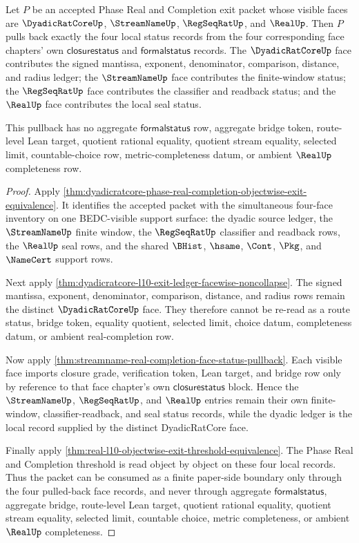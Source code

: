 \begin{theorem}
\label{thm:dyadicratcore-l10-face-status-pullback}
Let $P$ be an accepted Phase Real and Completion exit packet whose visible faces are $\DyadicRatCoreUp$, $\StreamNameUp$, $\RegSeqRatUp$, and $\RealUp$. Then $P$ pulls back exactly the four local status records from the four corresponding face chapters' own $\mathsf{closurestatus}$ and $\mathsf{formalstatus}$ records. The $\DyadicRatCoreUp$ face contributes the signed mantissa, exponent, denominator, comparison, distance, and radius ledger; the $\StreamNameUp$ face contributes the finite-window status; the $\RegSeqRatUp$ face contributes the classifier and readback status; and the $\RealUp$ face contributes the local seal status.

This pullback has no aggregate $\mathsf{formalstatus}$ row, aggregate bridge token, route-level Lean target, quotient rational equality, quotient stream equality, selected limit, countable-choice row, metric-completeness datum, or ambient $\RealUp$ completeness row.
\end{theorem}
\begin{proof}
Apply \autoref{thm:dyadicratcore-phase-real-completion-objectwise-exit-equivalence}. It identifies the accepted packet with the simultaneous four-face inventory on one BEDC-visible support surface: the dyadic source ledger, the $\StreamNameUp$ finite window, the $\RegSeqRatUp$ classifier and readback rows, the $\RealUp$ seal rows, and the shared $\BHist$, $\hsame$, $\Cont$, $\Pkg$, and $\NameCert$ support rows.

Next apply \autoref{thm:dyadicratcore-l10-exit-ledger-facewise-noncollapse}. The signed mantissa, exponent, denominator, comparison, distance, and radius rows remain the distinct $\DyadicRatCoreUp$ face. They therefore cannot be re-read as a route status, bridge token, equality quotient, selected limit, choice datum, completeness datum, or ambient real-completion row.

Now apply \autoref{thm:streamname-real-completion-face-status-pullback}. Each visible face imports closure grade, verification token, Lean target, and bridge row only by reference to that face chapter's own $\mathsf{closurestatus}$ block. Hence the $\StreamNameUp$, $\RegSeqRatUp$, and $\RealUp$ entries remain their own finite-window, classifier-readback, and seal status records, while the dyadic ledger is the local record supplied by the distinct DyadicRatCore face.

Finally apply \autoref{thm:real-l10-objectwise-exit-threshold-equivalence}. The Phase Real and Completion threshold is read object by object on these four local records. Thus the packet can be consumed as a finite paper-side boundary only through the four pulled-back face records, and never through aggregate $\mathsf{formalstatus}$, aggregate bridge, route-level Lean target, quotient rational equality, quotient stream equality, selected limit, countable choice, metric completeness, or ambient $\RealUp$ completeness.
\end{proof}

